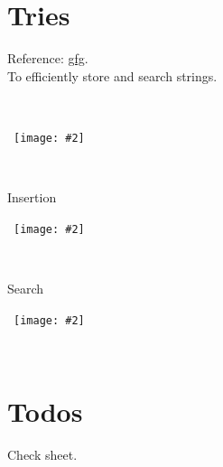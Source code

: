 \documentclass{article}
\newcommand{\image}[2]{\
    \begin{center}\
        \texttt{[image: \#2]}\
    \end{center}\
}
\begin{document}
\begin{sloppypar}
    \section{Tries}
    \noindent Reference: \href{https://www.geeksforgeeks.org/trie-insert-and-search/}{gfg}.\\
    \noindent To efficiently store and search strings.

    \image{0.6}{../images/trie1.png}

    \noindent Insertion
    \image{0.7}{../images/trie2.png}

    \noindent Search
    \image{0.7}{../images/trie3.png}

    \section{Todos}
    Check sheet.

\end{sloppypar}
\end{document}
